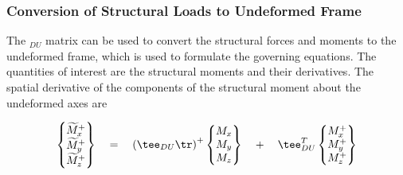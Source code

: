 \subsubsection{Conversion of Structural Loads to Undeformed Frame}
The \tee$_{DU}$ matrix can be used to convert the structural forces and moments to the undeformed frame, which is used to formulate the governing equations. The quantities of interest are the structural moments and their derivatives. The spatial derivative of the components of the structural moment about the undeformed axes are

\begin{equation}
\label{eqn:momentrotation}
\begin{Bmatrix}\widetilde{M}_x^+ \\ \widetilde{M}_y^+ \\ \widetilde{M}_z^+ \end{Bmatrix} \quad = \quad \left(\tee_{DU}\tr\right)^+ \begin{Bmatrix} M_x \\ M_y \\ M_z \end{Bmatrix} \quad + \quad \tee_{DU}^{T} \begin{Bmatrix} M_x^+ \\ M_y^+ \\ M_z^+ \end{Bmatrix}
\end{equation}

